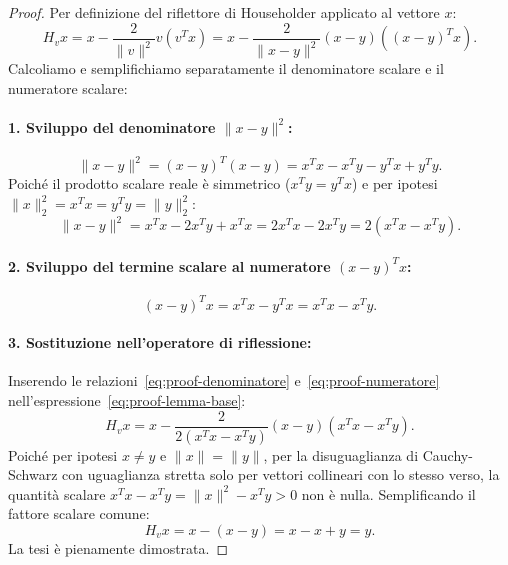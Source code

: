 \begin{proof}
Per definizione del riflettore di Householder applicato al vettore $x$:
\begin{equation}
    H_v x = x - \frac{2}{\|v\|^2} v (v^T x) = x - \frac{2}{\|x - y\|^2} (x - y) \left( (x - y)^T x \right).
    \label{eq:proof-lemma-base}
\end{equation}
Calcoliamo e semplifichiamo separatamente il denominatore scalare e il numeratore scalare:

\paragraph{1. Sviluppo del denominatore $\|x - y\|^2$:}
\begin{equation}
    \|x - y\|^2 = (x - y)^T (x - y) = x^T x - x^T y - y^T x + y^T y.
\end{equation}
Poich\'e il prodotto scalare reale \`e simmetrico ($x^T y = y^T x$) e per ipotesi $\|x\|_2^2 = x^T x = y^T y = \|y\|_2^2$:
\begin{equation}
    \|x - y\|^2 = x^T x - 2 x^T y + x^T x = 2 x^T x - 2 x^T y = 2 (x^T x - x^T y).
    \label{eq:proof-denominatore}
\end{equation}

\paragraph{2. Sviluppo del termine scalare al numeratore $(x - y)^T x$:}
\begin{equation}
    (x - y)^T x = x^T x - y^T x = x^T x - x^T y.
    \label{eq:proof-numeratore}
\end{equation}

\paragraph{3. Sostituzione nell'operatore di riflessione:}
Inserendo le relazioni~\eqref{eq:proof-denominatore} e~\eqref{eq:proof-numeratore} nell'espressione~\eqref{eq:proof-lemma-base}:
\begin{equation}
    H_v x = x - \frac{2}{2 (x^T x - x^T y)} (x - y) (x^T x - x^T y).
\end{equation}
Poich\'e per ipotesi $x \neq y$ e $\|x\| = \|y\|$, per la disuguaglianza di Cauchy-Schwarz con uguaglianza stretta solo per vettori collineari con lo stesso verso, la quantit\`a scalare $x^T x - x^T y = \|x\|^2 - x^T y > 0$ non \`e nulla. Semplificando il fattore scalare comune:
\begin{equation}
    H_v x = x - (x - y) = x - x + y = y.
\end{equation}
La tesi \`e pienamente dimostrata.
\end{proof}

